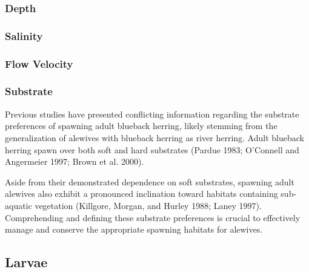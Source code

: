\documentclass[
]{book}
\begin{document}
\hypertarget{depth-7}{%
\subsubsection{Depth}\label{depth-7}}

\hypertarget{salinity-7}{%
\subsubsection{Salinity}\label{salinity-7}}

\hypertarget{flow-velocity-7}{%
\subsubsection{Flow Velocity}\label{flow-velocity-7}}

\hypertarget{substrate-7}{%
\subsubsection{Substrate}\label{substrate-7}}

Previous studies have presented conflicting information regarding the substrate preferences of spawning adult blueback herring, likely stemming from the generalization of alewives with blueback herring as river herring.
Adult blueback herring spawn over both soft and hard substrates (Pardue 1983; O'Connell and Angermeier 1997; Brown et al. 2000).

Aside from their demonstrated dependence on soft substrates, spawning adult alewives also exhibit a pronounced inclination toward habitats containing sub-aquatic vegetation (Killgore, Morgan, and Hurley 1988; Laney 1997).
Comprehending and defining these substrate preferences is crucial to effectively manage and conserve the appropriate spawning habitats for alewives.

\hypertarget{larvae}{%
\subsection{Larvae}\label{larvae}}
\end{document}
